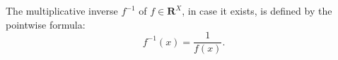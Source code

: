 The multiplicative inverse $f^{-1}$ of $f \in \mathbf{R}^X$, in case it exists, is defined by the pointwise formula:
$$f^{-1}(x) = \frac{1}{f(x)}.$$
